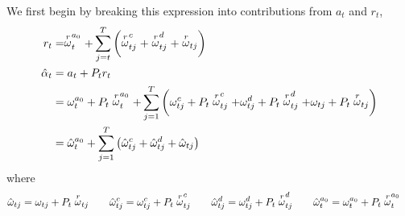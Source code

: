 \documentclass[12pt]{article}
\begin{document}
	We first begin by breaking this expression into contributions from $a_t$ and $r_t$,  
	\begin{align*}
	r_t &= \stackrel{r}{\omega}_t^{a_0} + \sum_{j=t}^{T} \left( \stackrel{r}{\omega}_{tj}^c + \stackrel{r}{\omega}_{tj}^d + \stackrel{r}{\omega}_{tj} \right) \\
	\hat{\alpha}_t &= a_t + P_t r_t \\
		&= \omega_t^{a_0} + P_t \stackrel{r}{\omega}_t^{a_0} + \sum_{j=1}^{T} \left( \omega_{tj}^c + P_t \stackrel{r}{\omega}_{tj}^c + \omega_{tj}^d + P_t \stackrel{r}{\omega}_{tj}^d + \omega_{tj} + P_t \stackrel{r}{\omega}_{tj} \right)  \\
		&= \hat{\omega}_t^{a_0} + \sum_{j=1}^{T} \left( \hat{\omega}_{tj}^c + \hat{\omega}_{tj}^d + \hat{\omega}_{tj} \right)
	\end{align*}
	where
	\begin{align*}
	\hat{\omega}_{tj} &= \omega_{tj} + P_t \stackrel{r}{\omega}_{tj} &\quad \hat{\omega}_{tj}^c &= \omega_{tj}^c + P_t \stackrel{r}{\omega}_{tj}^c &\quad
	 \hat{\omega}_{tj}^d &= \omega_{tj}^d + P_t \stackrel{r}{\omega}_{tj}^d &\quad \hat{\omega}_t^{a_0} &= \omega_t^{a_0} + P_t \stackrel{r}{\omega}_t^{a_0} 
	\end{align*}
	
\end{document}
